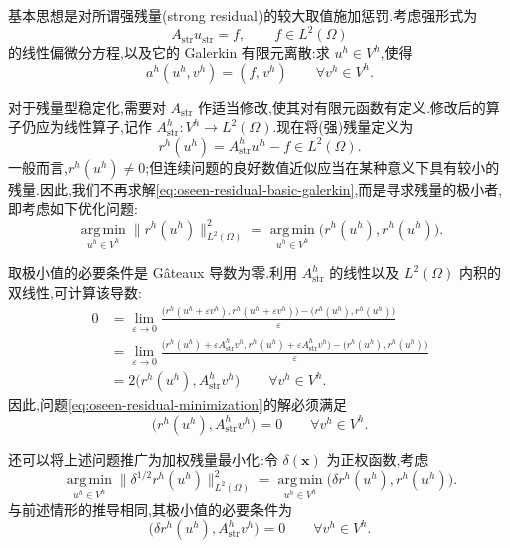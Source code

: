\begin{note}[残量型稳定化的基本思想]\label{note:oseen-residual-basic-idea}
基本思想是对所谓强残量(strong residual)的较大取值施加惩罚.考虑强形式为
\[
  A_{\mathrm{str}}u_{\mathrm{str}}=f,
  \qquad f\in L^2(\Omega)
\]
的线性偏微分方程,以及它的 Galerkin 有限元离散:求 $u^h\in V^h$,使得
\begin{equation}\label{eq:oseen-residual-basic-galerkin}
  a^h(u^h,v^h)=(f,v^h)
  \qquad\forall v^h\in V^h.
\end{equation}

对于残量型稳定化,需要对 $A_{\mathrm{str}}$ 作适当修改,使其对有限元函数有定义.修改后的算子仍应为线性算子,记作 $A_{\mathrm{str}}^h:V^h\to L^2(\Omega)$.现在将(强)残量定义为
\[
  r^h(u^h)=A_{\mathrm{str}}^h u^h-f\in L^2(\Omega).
\]
一般而言,$r^h(u^h)\ne0$;但连续问题的良好数值近似应当在某种意义下具有较小的残量.因此,我们不再求解\cref{eq:oseen-residual-basic-galerkin},而是寻求残量的极小者,即考虑如下优化问题:
\begin{equation}\label{eq:oseen-residual-minimization}
  \underset{u^h\in V^h}{\operatorname{arg\,min}}
       \|r^h(u^h)\|_{L^2(\Omega)}^2
  =\underset{u^h\in V^h}{\operatorname{arg\,min}}
       \bigl(r^h(u^h),r^h(u^h)\bigr).
\end{equation}

取极小值的必要条件是 Gâteaux 导数为零.利用 $A_{\mathrm{str}}^h$ 的线性以及 $L^2(\Omega)$ 内积的双线性,可计算该导数:
\[
\begin{aligned}
  0&=\lim_{\varepsilon\to0}
  \frac{\bigl(r^h(u^h+\varepsilon v^h),r^h(u^h+\varepsilon v^h)\bigr)
        -\bigl(r^h(u^h),r^h(u^h)\bigr)}{\varepsilon}\\
   &=\lim_{\varepsilon\to0}
  \frac{\bigl(r^h(u^h)+\varepsilon A_{\mathrm{str}}^h v^h,
              r^h(u^h)+\varepsilon A_{\mathrm{str}}^h v^h\bigr)
        -\bigl(r^h(u^h),r^h(u^h)\bigr)}{\varepsilon}\\
   &=2\bigl(r^h(u^h),A_{\mathrm{str}}^h v^h\bigr)
  \qquad\forall v^h\in V^h.
\end{aligned}
\]
因此,问题\cref{eq:oseen-residual-minimization}的解必须满足
\[
  \bigl(r^h(u^h),A_{\mathrm{str}}^h v^h\bigr)=0
  \qquad\forall v^h\in V^h.
\]

还可以将上述问题推广为加权残量最小化:令 $\delta(\bm{x})$ 为正权函数,考虑
\begin{equation}\label{eq:oseen-residual-weighted-minimization}
  \underset{u^h\in V^h}{\operatorname{arg\,min}}
       \|\delta^{1/2}r^h(u^h)\|_{L^2(\Omega)}^2
  =\underset{u^h\in V^h}{\operatorname{arg\,min}}
       \bigl(\delta r^h(u^h),r^h(u^h)\bigr).
\end{equation}
与前述情形的推导相同,其极小值的必要条件为
\begin{equation}\label{eq:oseen-residual-weighted-optimality}
  \bigl(\delta r^h(u^h),A_{\mathrm{str}}^h v^h\bigr)=0
  \qquad\forall v^h\in V^h.
\end{equation}


\end{note}
